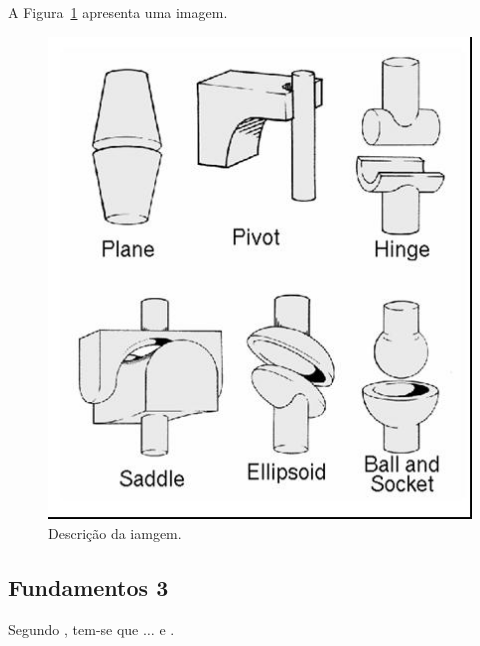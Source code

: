 
A Figura~\ref{fig_grafico} apresenta uma imagem.

\begin{figure}[h!]    
	\begin{center}
	    \includegraphics[scale=0.5]{imagens/fig2.jpg}
	\end{center}
    \caption{\label{fig_grafico}Descrição da iamgem.}
\end{figure}

\subsection{Fundamentos 3}
\label{sec:fundamentos3}


Segundo , tem-se que $\dots$ \cite{boulic:91} e \cite{smith:99}.